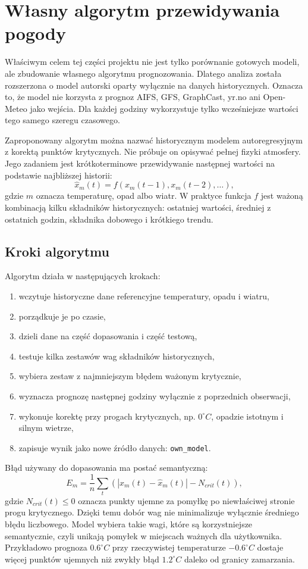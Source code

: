 \documentclass[a4paper,12pt]{article}
\begin{document}
\section{Własny algorytm przewidywania pogody}

Właściwym celem tej części projektu nie jest tylko porównanie gotowych modeli,
ale zbudowanie własnego algorytmu prognozowania. Dlatego analiza została
rozszerzona o model autorski oparty wyłącznie na danych historycznych.
Oznacza to, że model nie korzysta z prognoz AIFS, GFS, GraphCast, yr.no ani
Open-Meteo jako wejścia. Dla każdej godziny wykorzystuje tylko wcześniejsze
wartości tego samego szeregu czasowego.

\noindent
Zaproponowany algorytm można nazwać historycznym modelem autoregresyjnym z
korektą punktów krytycznych. Nie próbuje on opisywać pełnej fizyki atmosfery.
Jego zadaniem jest krótkoterminowe przewidywanie następnej wartości na
podstawie najbliższej historii:
\[
\hat{x}_m(t) = f(x_m(t-1), x_m(t-2), \dots),
\]
gdzie \(m\) oznacza temperaturę, opad albo wiatr. W praktyce funkcja \(f\)
jest ważoną kombinacją kilku składników historycznych: ostatniej wartości,
średniej z ostatnich godzin, składnika dobowego i krótkiego trendu.

\subsection{Kroki algorytmu}

Algorytm działa w następujących krokach:
\begin{enumerate}
    \item wczytuje historyczne dane referencyjne temperatury, opadu i wiatru,
    \item porządkuje je po czasie,
    \item dzieli dane na część dopasowania i część testową,
    \item testuje kilka zestawów wag składników historycznych,
    \item wybiera zestaw z najmniejszym błędem ważonym krytycznie,
    \item wyznacza prognozę następnej godziny wyłącznie z poprzednich obserwacji,
    \item wykonuje korektę przy progach krytycznych, np. \(0^\circ C\), opadzie istotnym i silnym wietrze,
    \item zapisuje wynik jako nowe źródło danych: \texttt{own\_model}.
\end{enumerate}

\noindent
Błąd używany do dopasowania ma postać semantyczną:
\[
E_{m} = \frac{1}{n}\sum_t \left(|x_m(t)-\hat{x}_m(t)| - N_{crit}(t)\right),
\]
gdzie \(N_{crit}(t)\leq 0\) oznacza punkty ujemne za pomyłkę po niewłaściwej
stronie progu krytycznego. Dzięki temu dobór wag nie minimalizuje wyłącznie
średniego błędu liczbowego. Model wybiera takie wagi, które są korzystniejsze
semantycznie, czyli unikają pomyłek w miejscach ważnych dla użytkownika.
Przykładowo prognoza \(0.6^\circ C\) przy rzeczywistej temperaturze
\(-0.6^\circ C\) dostaje więcej punktów ujemnych niż zwykły błąd \(1.2^\circ C\)
daleko od granicy zamarzania.
\end{document}
